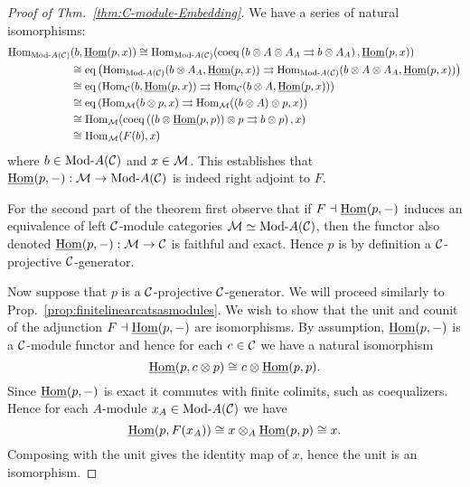 \documentclass{amsart}
\begin{document}
\begin{proof}[Proof of Thm.~\ref{thm:C-module-Embedding}]
	We have a series of natural isomorphisms:
	\begin{align*}
		\Hom_{\Mod{}{A}(\cC)}&(b, \IHom(p,x))  \cong \Hom_{\Mod{}{A}(\cC)}( \coeq \left( b \otimes A \otimes A_A \rightrightarrows b \otimes A_A  \right), \IHom(p,x)) \\
		& \cong \eq \left( \Hom_{\Mod{}{A}(\cC)}(b \otimes A_A, \IHom(p,x) )  \rightrightarrows \Hom_{\Mod{}{A}(\cC)}(  b \otimes A \otimes A_A, \IHom(p,x))  \right) \\
		& \cong \eq \left( \Hom_{\cC}(b, \IHom(p,x) )  \rightrightarrows \Hom_{\cC}(  b \otimes A, \IHom(p,x))  \right) \\
		& \cong \eq \left( \Hom_{\cM}(b \otimes p, x )  \rightrightarrows \Hom_{\cM}(  (b \otimes A) \otimes p, x)  \right) \\
		& \cong  \Hom_{\cM}( \coeq \left( (b \otimes \IHom(p,p)) \otimes p \rightrightarrows b \otimes p \right), x) \\
		& \cong \Hom_{\cM}( F(b), x)
	\end{align*}    
	where $b \in \Mod{}{A}(\cC)$ and $x \in \mathcal M$. This establishes that $\IHom(p,-): \cM \to \Mod{}{A}(\cC)$ is indeed right adjoint to $F$.

%

For the second part of the theorem first observe that if $F \dashv \operatorname{\underline{Hom}}(p,-)$ induces an equivalence of left $\mathcal C$-module categories $\cM \simeq \Mod{}{A}(\cC)$, then the functor also denoted $\operatorname{\underline{Hom}}(p, -): \mathcal M \to \mathcal C$ is faithful and exact. Hence $p$ is by definition a $\mathcal C$-projective $\mathcal C$-generator.

Now suppose that $p$ is a $\mathcal C$-projective $\mathcal C$-generator.  We will proceed similarly to Prop.~\ref{prop:finitelinearcatsasmodules}.
We wish to show that the unit and counit of the adjunction $F \dashv \operatorname{\underline{Hom}}(p,-)$ are isomorphisms. By assumption, $\operatorname{\underline{Hom}}(p, -)$ is a $\mathcal C$-module functor and hence for each $c \in \mathcal C$ we have a natural isomorphism
\begin{equation*}
	\operatorname{\underline{Hom}}(p, c \otimes p) \cong c \otimes \operatorname{\underline{Hom}}(p, p).
\end{equation*}
 Since $\operatorname{\underline{Hom}}(p, -)$ is exact it commutes with finite colimits, such as coequalizers. Hence for each $A$-module $x_A \in \Mod{}{A}(\cC)$ we have
 \begin{equation*}
 	\operatorname{\underline{Hom}}(p, F(x_A)) \cong x \otimes_A \operatorname{\underline{Hom}}(p,p) \cong x.
 \end{equation*}
Composing with the unit gives the identity map of $x$, hence the unit is an isomorphism. 


\end{proof}
\end{document}
